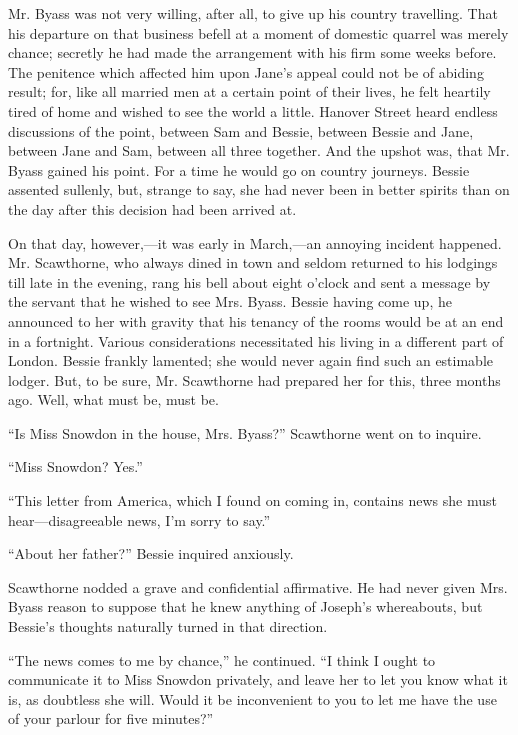 Mr. Byass was not very willing, after all, to give up his country
travelling. That his departure on that business befell at a moment of
domestic quarrel was merely chance; secretly he had made the arrangement
with his firm some weeks before. The penitence which affected him upon
Jane's appeal could not be of abiding result; for, like all married men
at a certain point of their lives, he felt heartily tired of home and
wished to see the world a little. Hanover Street heard endless
discussions of the point, between Sam and Bessie, between Bessie and
Jane, between Jane and Sam, between all three together. And the upshot
was, that Mr. Byass gained his point. For a time he would go on country
journeys. {}Bessie assented sullenly, but, strange to say, she had never
been in better spirits than on the day after this decision had been
arrived at.

On that day, however,---it was early in March,---an annoying incident
happened. Mr. Scawthorne, who always dined in town and seldom returned
to his lodgings till late in the evening, rang his bell about eight
o'clock and sent a message by the servant that he wished to see Mrs.
Byass. Bessie having come up, he announced to her with gravity that his
tenancy of the rooms would be at an end in a fortnight. Various
considerations necessitated his living in a different part of London.
Bessie frankly lamented; she would never again find such an estimable
lodger. But, to be sure, Mr. Scawthorne had prepared her for this, three
months ago. Well, what must be, must be.

``Is Miss Snowdon in the house, Mrs. Byass?'' Scawthorne went on to
inquire.

``Miss Snowdon? Yes.''

``This letter from America, which I found on coming in, contains news
she must hear---disagreeable news, I'm sorry to say.''

``About her father?'' Bessie inquired anxiously.

{}Scawthorne nodded a grave and confidential affirmative. He had never
given Mrs. Byass reason to suppose that he knew anything of Joseph's
whereabouts, but Bessie's thoughts naturally turned in that direction.

``The news comes to me by chance,'' he continued. ``I think I ought to
communicate it to Miss Snowdon privately, and leave her to let you know
what it is, as doubtless she will. Would it be inconvenient to you to
let me have the use of your parlour for five minutes?''

